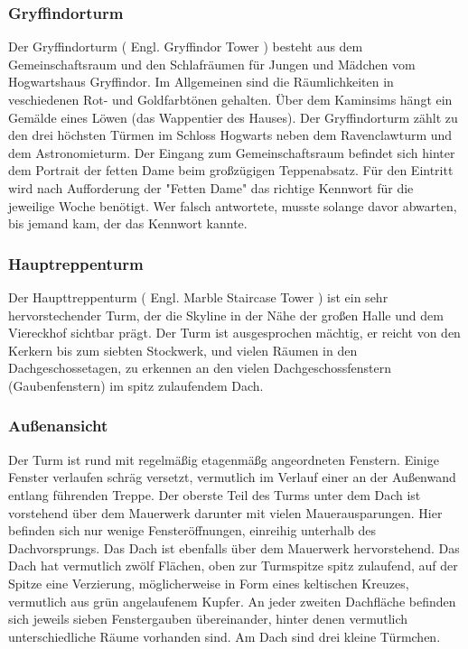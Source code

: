 \documentclass[a4paper, 10pt]{article}
\begin{document}
\subsubsection*{\large Gryffindorturm}
Der Gryffindorturm (  Engl.  Gryffindor Tower ) besteht aus dem Gemeinschaftsraum und den Schlafräumen für Jungen und Mädchen vom Hogwartshaus Gryffindor.
\vspace{10pt}
\newline
{}  
Im Allgemeinen sind die Räumlichkeiten in veschiedenen Rot- und Goldfarbtönen gehalten. Über dem Kaminsims hängt ein Gemälde eines Löwen (das Wappentier des Hauses). Der Gryffindorturm zählt zu den drei höchsten Türmen im Schloss Hogwarts neben dem Ravenclawturm und dem Astronomieturm.
\vspace{10pt}
\newline
{}  
Der Eingang zum Gemeinschaftsraum befindet sich hinter dem Portrait der fetten Dame beim großzügigen Teppenabsatz. Für den Eintritt wird nach Aufforderung der "Fetten Dame" das richtige Kennwort für die jeweilige Woche benötigt. Wer falsch antwortete, musste solange davor abwarten, bis jemand kam, der das Kennwort kannte.
\subsubsection*{\large Hauptreppenturm}
Der Haupttreppenturm (  Engl.  Marble Staircase Tower ) ist ein sehr hervorstechender Turm, der die Skyline in der Nähe der großen Halle und dem Viereckhof sichtbar prägt. Der Turm ist ausgesprochen mächtig, er reicht von den Kerkern bis zum siebten Stockwerk, und vielen Räumen in den Dachgeschossetagen, zu erkennen an den vielen Dachgeschossfenstern (Gaubenfenstern) im spitz zulaufendem Dach.
\subsubsection*{\large Außenansicht}
Der Turm ist rund mit regelmäßig etagenmäßg angeordneten Fenstern. Einige Fenster verlaufen schräg versetzt, vermutlich im Verlauf einer an der Außenwand entlang führenden Treppe. Der oberste Teil des Turms unter dem Dach ist vorstehend über dem Mauerwerk darunter mit vielen Mauerausparungen. Hier befinden sich nur wenige Fensteröffnungen, einreihig unterhalb des Dachvorsprungs. Das Dach ist ebenfalls über dem Mauerwerk hervorstehend. Das Dach hat vermutlich zwölf Flächen, oben zur Turmspitze spitz zulaufend, auf der Spitze eine Verzierung, möglicherweise in Form eines keltischen Kreuzes, vermutlich aus grün angelaufenem Kupfer.
\vspace{10pt}
\newline
{}  
An jeder zweiten Dachfläche befinden sich jeweils sieben Fenstergauben übereinander, hinter denen vermutlich unterschiedliche Räume vorhanden sind. Am Dach sind drei kleine Türmchen.
\end{document}
